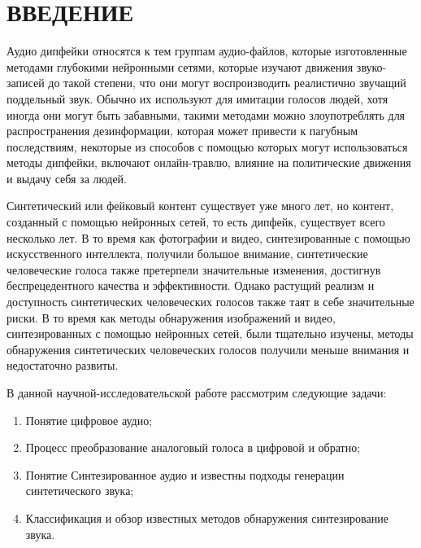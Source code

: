 \part*{ВВЕДЕНИЕ}

Аудио дипфейки относятся к тем группам аудио-файлов, которые изготовленные методами глубокими нейронными сетями, которые изучают движения звуко-записей до такой степени, что они могут воспроизводить реалистично звучащий поддельный звук. Обычно их используют для имитации голосов людей, хотя иногда они могут быть забавными, такими методами можно злоупотреблять для распространения дезинформации, которая может привести к пагубным последствиям, некоторые из способов с помощью которых могут использоваться методы дипфейки, включают онлайн-травлю, влияние на политические движения и выдачу себя за людей.


Синтетический или фейковый контент существует уже много лет, но контент, созданный с помощью нейронных сетей, то есть дипфейк, существует всего несколько лет. В то время как фотографии и видео, синтезированные с помощью искусственного интеллекта, получили большое внимание, синтетические человеческие голоса также претерпели значительные изменения, достигнув беспрецедентного качества и эффективности. Однако растущий реализм и доступность синтетических человеческих голосов также таят в себе значительные риски. В то время как методы обнаружения изображений и видео, синтезированных с помощью нейронных сетей, были тщательно изучены, методы обнаружения синтетических человеческих голосов получили меньше внимания и недостаточно развиты. 

В данной научной-исследовательской работе рассмотрим следующие задачи:

\begin{enumerate}
    \item Понятие цифровое аудио;
    \item Процесс преобразование аналоговый голоса в цифровой и
обратно;
    \item Понятие Синтезированное аудио и известны подходы генерации синтетического звука;
    \item Классификация и обзор известных методов обнаружения синтезирование звука.
\end{enumerate}


